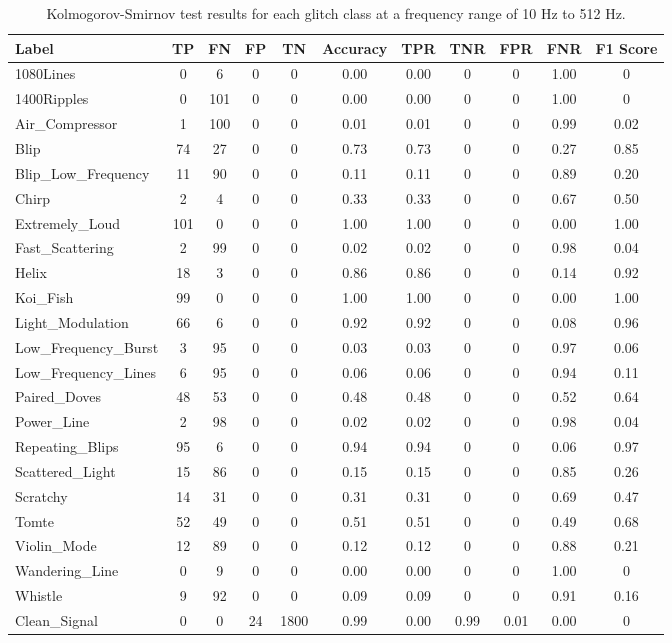 \documentclass[12pt]{article}
\begin{document}
\begin{table}[H]
  \begin{tabular}{lcccccccccc}
  \toprule
  Label & TP & FN & FP & TN & Accuracy & TPR & TNR & FPR & FNR & F1 Score \\
\midrule
  1080Lines & 0 & 6 & 0 & 0 & 0.00 & 0.00 & 0 & 0 & 1.00 & 0 \\
  1400Ripples & 0 & 101 & 0 & 0 & 0.00 & 0.00 & 0 & 0 & 1.00 & 0 \\
  Air\_Compressor & 1 & 100 & 0 & 0 & 0.01 & 0.01 & 0 & 0 & 0.99 & 0.02 \\
  Blip & 74 & 27 & 0 & 0 & 0.73 & 0.73 & 0 & 0 & 0.27 & 0.85 \\
  Blip\_Low\_Frequency & 11 & 90 & 0 & 0 & 0.11 & 0.11 & 0 & 0 & 0.89 & 0.20 \\
  Chirp & 2 & 4 & 0 & 0 & 0.33 & 0.33 & 0 & 0 & 0.67 & 0.50 \\
  Extremely\_Loud & 101 & 0 & 0 & 0 & 1.00 & 1.00 & 0 & 0 & 0.00 & 1.00 \\
  Fast\_Scattering & 2 & 99 & 0 & 0 & 0.02 & 0.02 & 0 & 0 & 0.98 & 0.04 \\
  Helix & 18 & 3 & 0 & 0 & 0.86 & 0.86 & 0 & 0 & 0.14 & 0.92 \\
  Koi\_Fish & 99 & 0 & 0 & 0 & 1.00 & 1.00 & 0 & 0 & 0.00 & 1.00 \\
  Light\_Modulation & 66 & 6 & 0 & 0 & 0.92 & 0.92 & 0 & 0 & 0.08 & 0.96 \\
  Low\_Frequency\_Burst & 3 & 95 & 0 & 0 & 0.03 & 0.03 & 0 & 0 & 0.97 & 0.06 \\
  Low\_Frequency\_Lines & 6 & 95 & 0 & 0 & 0.06 & 0.06 & 0 & 0 & 0.94 & 0.11 \\
  Paired\_Doves & 48 & 53 & 0 & 0 & 0.48 & 0.48 & 0 & 0 & 0.52 & 0.64 \\
  Power\_Line & 2 & 98 & 0 & 0 & 0.02 & 0.02 & 0 & 0 & 0.98 & 0.04 \\
  Repeating\_Blips & 95 & 6 & 0 & 0 & 0.94 & 0.94 & 0 & 0 & 0.06 & 0.97 \\
  Scattered\_Light & 15 & 86 & 0 & 0 & 0.15 & 0.15 & 0 & 0 & 0.85 & 0.26 \\
  Scratchy & 14 & 31 & 0 & 0 & 0.31 & 0.31 & 0 & 0 & 0.69 & 0.47 \\
  Tomte & 52 & 49 & 0 & 0 & 0.51 & 0.51 & 0 & 0 & 0.49 & 0.68 \\
  Violin\_Mode & 12 & 89 & 0 & 0 & 0.12 & 0.12 & 0 & 0 & 0.88 & 0.21 \\
  Wandering\_Line & 0 & 9 & 0 & 0 & 0.00 & 0.00 & 0 & 0 & 1.00 & 0 \\
  Whistle & 9 & 92 & 0 & 0 & 0.09 & 0.09 & 0 & 0 & 0.91 & 0.16 \\
  Clean\_Signal & 0 & 0 & 24 & 1800 & 0.99 & 0.00 & 0.99 & 0.01 & 0.00 & 0 \\
  \bottomrule
  \end{tabular}
  \caption{Kolmogorov-Smirnov test results for each glitch class at a frequency range of 10 Hz to 512 Hz.}
  \label{tab:ks_low_frequency_results}
\end{table}
\end{document}
